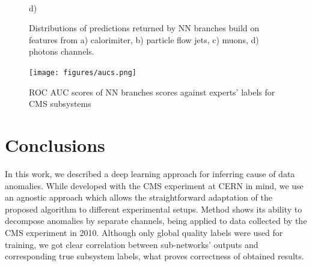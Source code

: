 \documentclass[a4paper]{jpconf}
\begin{document}
\begin{figure}[H]
\begin{minipage}[h!]{0.47\linewidth}
\end{minipage}
\hfill
\begin{minipage}[h!]{0.47\linewidth}
 \\ d) 
\end{minipage}
\caption{\label{fig:predictions} Distributions of predictions returned by NN branches build on features from a) calorimiter, b) particle flow jets, c) muons, d) photons
channels.}
\end{figure}


\begin{figure}[H]
\begin{center}
\texttt{[image: figures/aucs.png]}
\end{center}
\caption{\label{fig:matrix}ROC AUC scores of NN branches scores against experts' labels for CMS subsystems}
\end{figure}


\section{Conclusions}
In this work, we described a deep learning approach for inferring cause of data anomalies. While developed
with the CMS experiment at CERN in mind, we use an agnostic approach which allows the straightforward
adaptation of the proposed algorithm to different experimental setups. Method shows its ability to decompose anomalies by separate channels, being applied to data collected by the CMS experiment in 2010. Although only global quality labels were used for training, we got clear correlation between sub-networks’ outputs and corresponding true subsystem labels, what proves correctness of obtained results.
\end{document}
